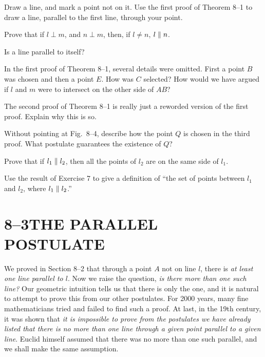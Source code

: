 \documentclass[11pt]{book}
\begin{document}
\begin{exercisecols}
\begin{exlist}
\item Draw a line, and mark a point not on it. Use the first proof of Theorem
  8--1 to draw a line, parallel to the first line, through your point.
\item Prove that if $l \perp m$, and $n \perp m$, then, if $l \neq n$,
  $l \mathrel{\|} n$.
\item Is a line parallel to itself?
\item In the first proof of Theorem 8--1, several details were omitted. First
  a point $B$ was chosen and then a point $E$. How was $C$ selected? How would
  we have argued if $l$ and $m$ were to intersect on the other side of $AB$?
\item The second proof of Theorem 8--1 is really just a reworded version of
  the first proof. Explain why this is so.
\item Without pointing at Fig.~8--4, describe how the point $Q$ is chosen in
  the third proof. What postulate guarantees the existence of $Q$?
\item Prove that if $l_1 \mathrel{\|} l_2$, then all the points of $l_2$ are on the
  same side of $l_1$.
\item Use the result of Exercise 7 to give a definition of ``the set of points
  between $l_1$ and $l_2$, where $l_1 \mathrel{\|} l_2$.''
\end{exlist}
\end{exercisecols}

\section*{8--3\quad THE PARALLEL POSTULATE}

We proved in Section 8--2 that through a point $A$ not on line $l$, there is
\emph{at least one line parallel to $l$}. Now we raise the question, \emph{is
there more than one such line?} Our geometric intuition tells us that there is
only the one, and it is natural to attempt to prove this from our other
postulates. For 2000 years, many fine mathematicians tried and failed to find
such a proof. At last, in the 19th century, it was shown that \emph{it is
impossible to prove from the postulates we have already listed that there is
no more than one line through a given point parallel to a given line}. Euclid
himself assumed that there was no more than one such parallel, and we shall
make the same assumption.
\end{document}
